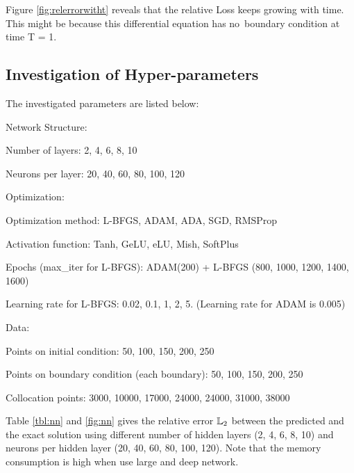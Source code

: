 \documentclass[11pt, a4paper]{article}
\begin{document}
      Figure \ref{fig:relerrorwitht} reveals that the relative Loss keeps growing with time. This might be because this differential equation has no boundary condition at time T = 1.

    \newpage
    \subsection{Investigation of Hyper-parameters}

    The investigated parameters are listed below:
    \begin{compactenum}
        \item [Network Structure:]~
        \begin{compactenum}
            \item Number of layers: 2, 4, 6, 8, 10
            \item Neurons per layer: 20, 40, 60, 80, 100, 120
        \end{compactenum}
        \item [Optimization:]~
        \begin{compactenum}
            \item Optimization method: L-BFGS, ADAM, ADA, SGD, RMSProp
            \item Activation function: Tanh, GeLU, eLU, Mish, SoftPlus
            \item Epochs (max\_iter for L-BFGS): ADAM(200) + L-BFGS (800, 1000, 1200, 1400, 1600)
            \item Learning rate for L-BFGS: 0.02, 0.1, 1, 2, 5. (Learning rate for ADAM is 0.005)
        \end{compactenum}
        \item[Data:]~
        \begin{compactenum}
            \item Points on initial condition: 50, 100, 150, 200, 250
            \item Points on boundary condition (each boundary): 50, 100, 150, 200, 250
            \item Collocation points: 3000, 10000, 17000, 24000, 24000, 31000, 38000
        \end{compactenum}
    \end{compactenum}
    
    Table \ref{tbl:nn} and \cref{fig:nn} gives the relative error $\mathbb{L}_2$ between the predicted and 
    the exact solution using different number of hidden layers (2, 4, 6, 8, 10) and neurons per hidden layer (20, 40, 60, 80, 100, 120). 
    Note that the memory consumption is high when use large and deep network.
\end{document}
